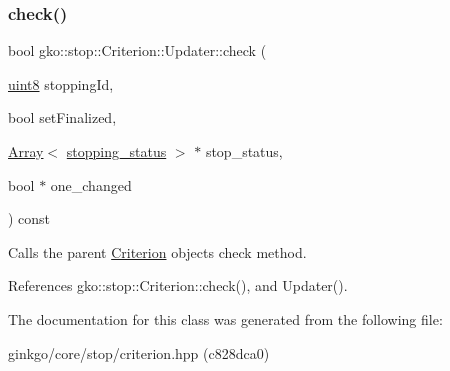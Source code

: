 \subsubsection{\texorpdfstring{check()}{check()}}
{\footnotesize\ttfamily bool gko\+::stop\+::\+Criterion\+::\+Updater\+::check (\begin{DoxyParamCaption}\item[{\hyperlink{namespacegko_a3950fc3732811a8563484e5098c31531}{uint8}}]{stopping\+Id,  }\item[{bool}]{set\+Finalized,  }\item[{\hyperlink{classgko_1_1Array}{Array}$<$ \hyperlink{classgko_1_1stopping__status}{stopping\+\_\+status} $>$ $\ast$}]{stop\+\_\+status,  }\item[{bool $\ast$}]{one\+\_\+changed }\end{DoxyParamCaption}) const}



Calls the parent \hyperlink{classgko_1_1stop_1_1Criterion}{Criterion} object\textquotesingle{}s check method. 



References gko\+::stop\+::\+Criterion\+::check(), and Updater().



The documentation for this class was generated from the following file\+:\begin{DoxyCompactItemize}
\item 
ginkgo/core/stop/criterion.\+hpp (c828dca0)\end{DoxyCompactItemize}
